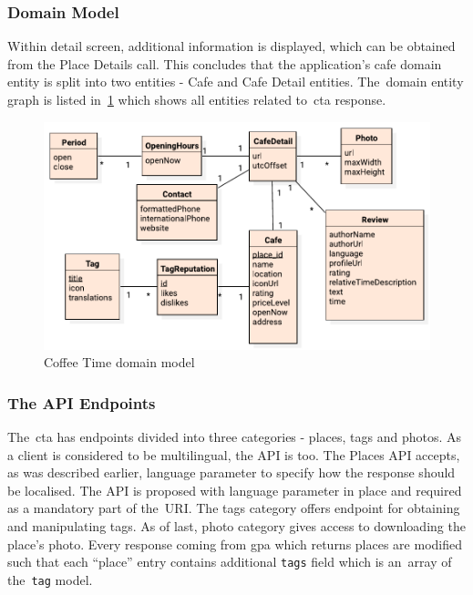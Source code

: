 \subsubsection{Domain Model}
Within detail screen, additional information is displayed, which can be obtained from the Place Details call. This concludes that the application's cafe domain entity is split into two entities - Cafe and Cafe Detail entities. The~domain entity graph is listed in~\cref{fig:domain} which shows all entities related to~\gls{cta} response.

\begin{figure}[ht]
    \centering
    \includegraphics[width=0.9\linewidth]{img/analysis/domain.pdf}
    \caption{Coffee Time domain model}
    \label{fig:domain}
\end{figure}
\subsubsection{The API Endpoints}
The~\gls{cta} has endpoints divided into three categories - places, tags and photos. As a client is considered to be multilingual, the API is too. The Places API accepts, as was described earlier, language parameter to specify how the response should be localised. The API is proposed with language parameter in place and required as a mandatory part of the~URI. The tags category offers endpoint for obtaining and manipulating tags. As of last, photo category gives access to downloading the place's photo. Every response coming from \gls{gpa} which returns places are modified such that each ``place'' entry contains additional \verb|tags| field which is an~array of the~\verb|tag| model. 

